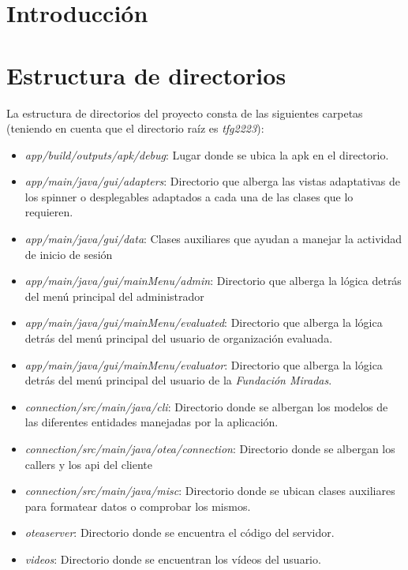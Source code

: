 
\section{Introducción}


\section{Estructura de directorios}
La estructura de directorios del proyecto consta de las siguientes carpetas (teniendo en cuenta que el directorio raíz es \textit{tfg2223}):
\begin{itemize}
    \item \textit{app/build/outputs/apk/debug}: Lugar donde se ubica la apk en el directorio.
    \item \textit{app/main/java/gui/adapters}: Directorio que alberga las vistas adaptativas de los spinner o desplegables adaptados a cada una de las clases que lo requieren.
    \item \textit{app/main/java/gui/data}: Clases auxiliares que ayudan a manejar la actividad de inicio de sesión
    \item \textit{app/main/java/gui/mainMenu/admin}: Directorio que alberga la lógica detrás del menú principal del administrador
    \item \textit{app/main/java/gui/mainMenu/evaluated}: Directorio que alberga la lógica detrás del menú principal del usuario de organización evaluada.
    \item \textit{app/main/java/gui/mainMenu/evaluator}: Directorio que alberga la lógica detrás del menú principal del usuario de la \textit{Fundación Miradas}.
    \item \textit{connection/src/main/java/cli}: Directorio donde se albergan los modelos de las diferentes entidades manejadas por la aplicación.
    \item \textit{connection/src/main/java/otea/connection}: Directorio donde se albergan los callers y los api del cliente
    \item \textit{connection/src/main/java/misc}: Directorio donde se ubican clases auxiliares para formatear datos o comprobar los mismos.
    \item \textit{oteaserver}: Directorio donde se encuentra el código del servidor.
    \item \textit{videos}: Directorio donde se encuentran los vídeos del usuario.
\end{itemize}

